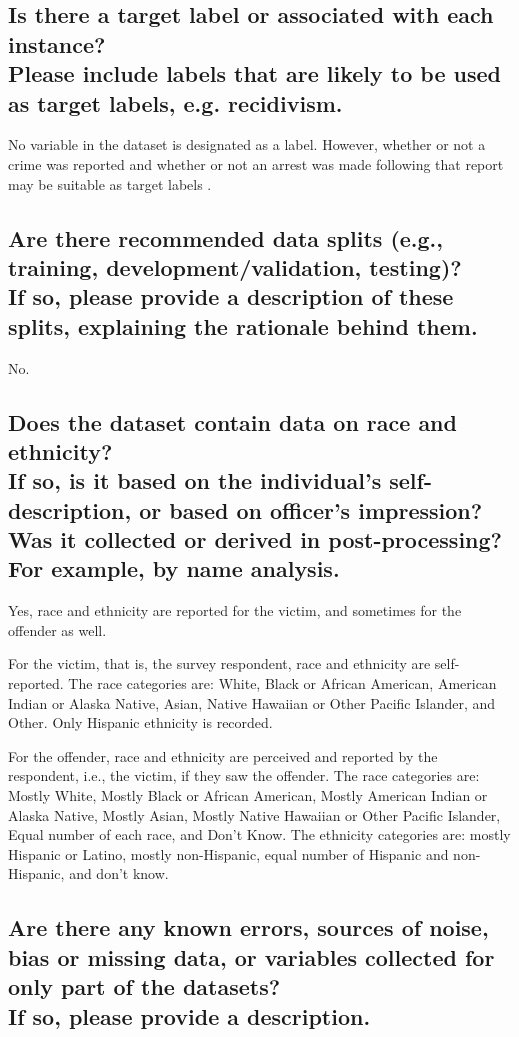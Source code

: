 \documentclass[letterpaper, 10 pt, conference]{ieeeconf}  %
\newcommand{\subtitle}[1]{{\\ \small \normalfont \color{purple} #1}}
\begin{document}
\subsection{Is there a target label or associated with each instance? \subtitle{Please include labels that are likely to be used as target labels, e.g. recidivism.}}

No variable in the dataset is designated as a label. However, whether or not a crime was reported and whether or not an arrest was made following that report may be suitable as target labels \cite{fogliato2022validity}.

\subsection{Are there recommended data splits (e.g., training, development/validation, testing)? \subtitle{If so, please provide a description of these splits, explaining the rationale behind them.}}

No.

\subsection{Does the dataset contain data on race and ethnicity? \subtitle{If so, is it based on the individual's self-description, or based on officer's impression? Was it collected or derived in post-processing? For example, by name analysis.}}

Yes, race and ethnicity are reported for the victim, and sometimes for the offender as well. 

For the victim, that is, the survey respondent, race and ethnicity are self-reported. 
The race categories are: White, Black or African American, American Indian or Alaska Native, Asian, Native Hawaiian or Other Pacific Islander, and Other. Only Hispanic ethnicity is recorded.

For the offender, race and ethnicity are perceived and reported by the respondent, i.e., the victim, if they saw the offender. The race categories are: Mostly White, Mostly Black or African American, Mostly American Indian or Alaska Native, Mostly Asian, Mostly Native Hawaiian or Other Pacific Islander, Equal number of each race, and Don't Know. The ethnicity categories are: mostly Hispanic or Latino, mostly non-Hispanic, equal number of Hispanic and non-Hispanic, and don't know.

\subsection{Are there any known errors, sources of noise, bias or missing data, or variables collected for only part of the datasets? \subtitle{If so, please provide a description.}}
\end{document}
